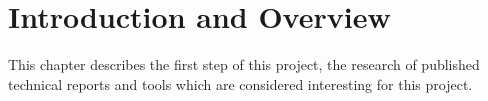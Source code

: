 \section{Introduction and Overview}
This chapter describes the first step of this project, the research of published technical reports and tools which are considered interesting for this project.

